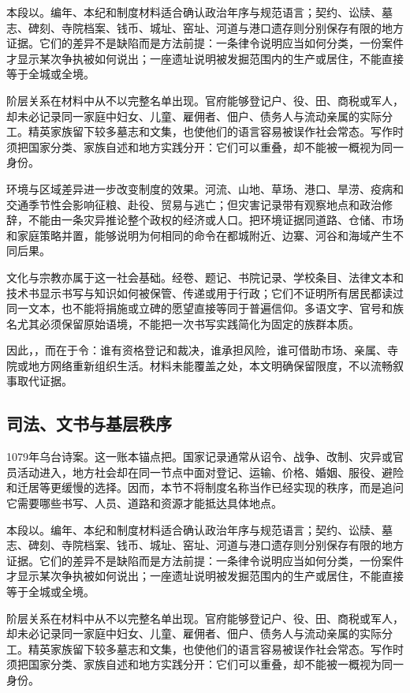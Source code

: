 本段以。编年、本纪和制度材料适合确认政治年序与规范语言；契约、讼牍、墓志、碑刻、寺院档案、钱币、城址、窑址、河道与港口遗存则分别保存有限的地方证据。它们的差异不是缺陷而是方法前提：一条律令说明应当如何分类，一份案件才显示某次争执被如何说出；一座遗址说明被发掘范围内的生产或居住，不能直接等于全城或全境。

阶层关系在材料中从不以完整名单出现。官府能够登记户、役、田、商税或军人，却未必记录同一家庭中妇女、儿童、雇佣者、佃户、债务人与流动亲属的实际分工。精英家族留下较多墓志和文集，也使他们的语言容易被误作社会常态。写作时须把国家分类、家族自述和地方实践分开：它们可以重叠，却不能被一概视为同一身份。

环境与区域差异进一步改变制度的效果。河流、山地、草场、港口、旱涝、疫病和交通季节性会影响征粮、赴役、贸易与逃亡；但灾害记录带有观察地点和政治修辞，不能由一条灾异推论整个政权的经济或人口。把环境证据同道路、仓储、市场和家庭策略并置，能够说明为何相同的命令在都城附近、边寨、河谷和海域产生不同后果。

文化与宗教亦属于这一社会基础。经卷、题记、书院记录、学校条目、法律文本和技术书显示书写与知识如何被保管、传递或用于行政；它们不证明所有居民都读过同一文本，也不能将捐施或立碑的愿望直接等同于普遍信仰。多语文字、官号和族名尤其必须保留原始语境，不能把一次书写实践简化为固定的族群本质。

因此，，而在于令：谁有资格登记和裁决，谁承担风险，谁可借助市场、亲属、寺院或地方网络重新组织生活。材料未能覆盖之处，本文明确保留限度，不以流畅叙事取代证据。

\subsection{司法、文书与基层秩序}

1079年乌台诗案。这一账本锚点把。国家记录通常从诏令、战争、改制、灾异或官员活动进入，地方社会却在同一节点中面对登记、运输、价格、婚姻、服役、避险和迁居等更缓慢的选择。因而，本节不将制度名称当作已经实现的秩序，而是追问它需要哪些书写、人员、道路和资源才能抵达具体地点。

本段以。编年、本纪和制度材料适合确认政治年序与规范语言；契约、讼牍、墓志、碑刻、寺院档案、钱币、城址、窑址、河道与港口遗存则分别保存有限的地方证据。它们的差异不是缺陷而是方法前提：一条律令说明应当如何分类，一份案件才显示某次争执被如何说出；一座遗址说明被发掘范围内的生产或居住，不能直接等于全城或全境。

阶层关系在材料中从不以完整名单出现。官府能够登记户、役、田、商税或军人，却未必记录同一家庭中妇女、儿童、雇佣者、佃户、债务人与流动亲属的实际分工。精英家族留下较多墓志和文集，也使他们的语言容易被误作社会常态。写作时须把国家分类、家族自述和地方实践分开：它们可以重叠，却不能被一概视为同一身份。

